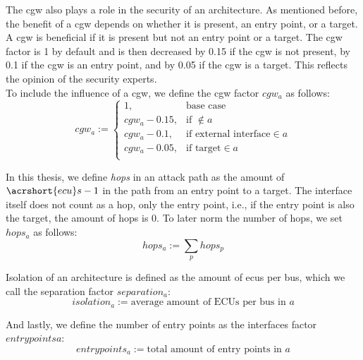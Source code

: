 \hfill \break

The \acrshort{cgw} also plays a role in the security of an architecture.
As mentioned before, the benefit of a \acrshort{cgw} depends on whether it is present, an entry point, or a target.
A \acrshort{cgw} is beneficial if it is present but not an entry point or a target.
The \acrshort{cgw} factor is 1 by default and is then decreased by 0.15 if the \acrshort{cgw} is not present,
by 0.1 if the \acrshort{cgw} is an entry point, and by 0.05 if the \acrshort{cgw} is a target.
This reflects the opinion of the security experts.\\
To include the influence of a \acrshort{cgw}, we define the \acrshort{cgw} factor $cgw_{a}$ as follows:\\
\begin{equation}
    cgw_{a} := 
    \begin{cases}
    1,&\text{base case}\\
    cgw_{a} - 0.15,&\text{if } \not\in a\\
    cgw_{a} - 0.1,&\text{if external interface} \in a\\
    cgw_{a} - 0.05,&\text{if target} \in a\\
    \end{cases} \label{eq:cgw}
\end{equation}

\hfill \break

In this thesis, we define \textit{hops} in an attack path as the amount of \textit{$\acrshort{ecu}s - 1$} in the path from an entry point to a target.
The interface itself does not count as a hop, only the entry point, i.e., if the entry point is also the target, the amount of hops is 0.
To later norm the number of hops, we set $hops_{a}$ as follows:\\
\begin{equation}
    hops_{a} := \sum_{p} hops_{p} \label{eq:hops}
\end{equation}

\hfill \break

Isolation of an architecture is defined as the amount of \acrshort{ecu}s per bus, which we call the separation factor $separation_{a}$:\\
\begin{equation}
    isolation_{a} := \text{average amount of ECUs per bus in } a \label{eq:isolation}
\end{equation}

\hfill \break

And lastly, we define the number of entry points as the interfaces factor $entrypoints{a}$:\\
\begin{equation}
    entrypoints_{a} := \text{total amount of entry points in } a \label{eq:entrypoints}
\end{equation}

